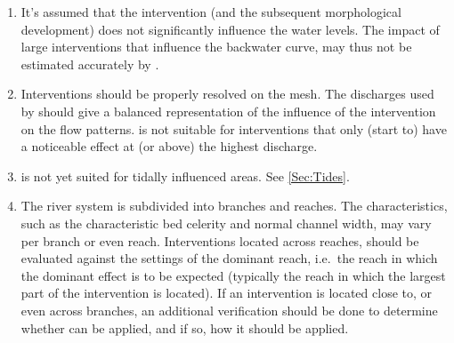 \begin{enumerate}
\item It's assumed that the intervention (and the subsequent morphological development) does not significantly influence the water levels.
The impact of large interventions that influence the backwater curve, may thus not be estimated accurately by \dfmi.

\item Interventions should be properly resolved on the \dflowfm mesh.
The discharges used by \dfmi should give a balanced representation of the influence of the intervention on the flow patterns.
\dfmi is not suitable for interventions that only (start to) have a noticeable effect at (or above) the highest discharge.

\item \dfastmi is not yet suited for tidally influenced areas.
See \autoref{Sec:Tides}.

\item \label{reach_bnd} The river system is subdivided into branches and reaches.
The characteristics, such as the characteristic bed celerity and normal channel width, may vary per branch or even reach.
Interventions located across reaches, should be evaluated against the settings of the dominant reach, i.e.~the reach in which the dominant effect is to be expected (typically the reach in which the largest part of the intervention is located).
If an intervention is located close to, or even across branches, an additional verification should be done to determine whether \dfmi can be applied, and if so, how it should be applied.


\end{enumerate}
